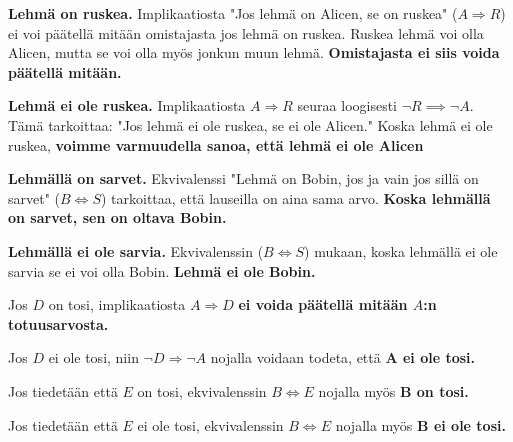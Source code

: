 \documentclass[12pt,a4paper]{article}
\begin{document}
\begin{kohta}
  \item %
    \begin{alakohta}
      \item \textbf{Lehmä on ruskea.} Implikaatiosta "Jos lehmä on Alicen, 
      se on ruskea" ($A \Rightarrow R$) ei voi päätellä mitään omistajasta 
      jos lehmä on ruskea. Ruskea lehmä voi olla Alicen, mutta se voi olla 
      myös jonkun muun lehmä. 
      \textbf{Omistajasta ei siis voida päätellä mitään.}

      \item \textbf{Lehmä ei ole ruskea.} Implikaatiosta $A \Rightarrow R$ 
      seuraa loogisesti $\neg R \implies \neg A$. Tämä 
      tarkoittaa: "Jos lehmä ei ole ruskea, se ei ole Alicen." Koska 
      lehmä ei ole ruskea,
      \textbf{voimme varmuudella sanoa, että lehmä ei ole Alicen}

      \item \textbf{Lehmällä on sarvet.} Ekvivalenssi "Lehmä on Bobin, jos
      ja vain jos sillä on sarvet" ($B \iff S$) tarkoittaa, että lauseilla
      on aina sama arvo.
      \textbf{Koska lehmällä on sarvet, sen on oltava Bobin.}

      \item \textbf{Lehmällä ei ole sarvia.} Ekvivalenssin ($B \iff S$)
      mukaan, koska lehmällä ei ole sarvia se ei voi olla Bobin.
      \textbf{Lehmä ei ole Bobin.}
    \end{alakohta}

  \item %
    \begin{alakohta}
      \item Jos $D$ on tosi, implikaatiosta $A \Rightarrow D$ 
      \textbf{ei voida päätellä mitään $A$:n totuusarvosta.}

      \item Jos $D$ ei ole tosi, niin $\neg D \Rightarrow \neg A$ nojalla 
      voidaan todeta, että \textbf{A ei ole tosi.}

      \item Jos tiedetään että $E$ on tosi, ekvivalenssin $B \iff E$ nojalla myös
      \textbf{B on tosi.}

      \item Jos tiedetään että $E$ ei ole tosi, ekvivalenssin $B \iff E$ nojalla myös
      \textbf{B ei ole tosi.}
    \end{alakohta}
\end{kohta}
\end{document}
